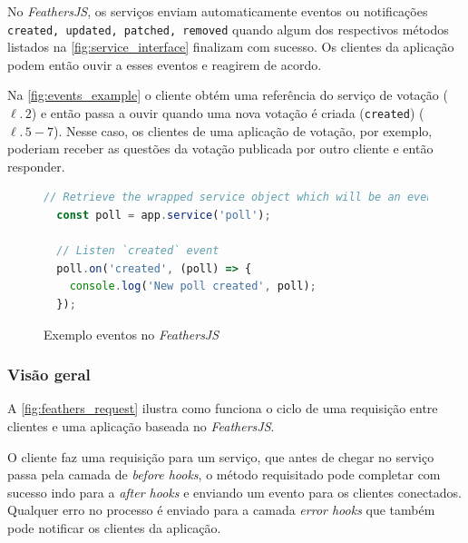 No \textit{\textit{FeathersJS}}, os serviços enviam automaticamente eventos ou notificações
\texttt{created, updated, patched, removed} quando algum dos respectivos métodos listados
na \autoref{fig:service_interface} finalizam com sucesso.
Os clientes da aplicação podem então ouvir a esses eventos e reagirem de acordo.

Na \autoref{fig:events_example} o cliente obtém uma referência do serviço
de votação ($\ell.\,2$) e então passa a ouvir quando uma nova votação é criada (\texttt{created}) ($\ell.\,5-7$).
Nesse caso, os clientes de uma aplicação de votação, por exemplo, poderiam
receber as questões da votação publicada por outro cliente e então responder.

\begin{figure}[h]
\begin{lstlisting}[language=JavaScript]
  // Retrieve the wrapped service object which will be an event emitter
  const poll = app.service('poll');

  // Listen `created` event
  poll.on('created', (poll) => {
    console.log('New poll created', poll);
  });
\end{lstlisting}
\caption{Exemplo eventos no \textit{\textit{FeathersJS}}}
\label{fig:events_example}
\end{figure}

\subsubsection{Visão geral}

A \autoref{fig:feathers_request} ilustra como funciona o ciclo de uma requisição
entre clientes e uma aplicação baseada no \textit{FeathersJS}.

O cliente faz uma requisição para um serviço, que antes de chegar no serviço passa
pela camada de \textit{before hooks}, o método requisitado pode completar com sucesso indo para a
\textit{after hooks} e enviando um evento para os clientes conectados. Qualquer erro no processo
é enviado para a camada \textit{error hooks} que também pode notificar os clientes da aplicação.

